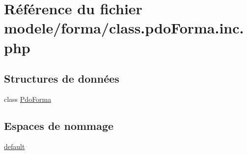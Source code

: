 \hypertarget{class_8pdo_forma_8inc_8php}{}\section{Référence du fichier modele/forma/class.pdo\+Forma.\+inc.\+php}
\label{class_8pdo_forma_8inc_8php}
\subsection*{Structures de données}
\begin{DoxyCompactItemize}
\item 
class \hyperlink{class_pdo_forma}{Pdo\+Forma}
\end{DoxyCompactItemize}
\subsection*{Espaces de nommage}
\begin{DoxyCompactItemize}
\item 
 \hyperlink{namespacedefault}{default}
\end{DoxyCompactItemize}
